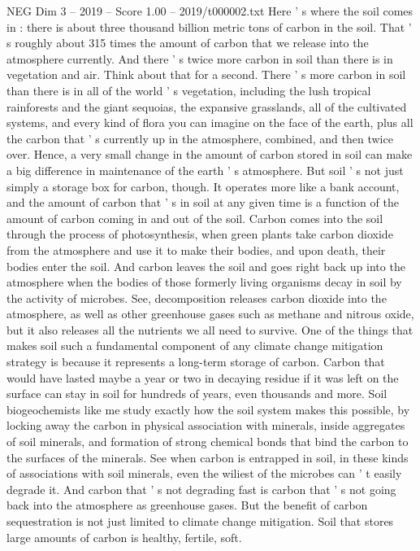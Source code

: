 \begin{textsample}{NEG Dim 3 – 2019 – Score 1.00 – 2019/t000002.txt}
Here ' s where the soil comes in : there is about three thousand billion metric tons of carbon in the soil.
That ' s roughly about 315 times the amount of carbon that we release into the atmosphere currently.
And there ' s twice more carbon in soil than there is in vegetation and air.
Think about that for a second.
There ' s more carbon in soil than there is in all of the world ' s vegetation, including the lush tropical rainforests and the giant sequoias, the expansive grasslands, all of the cultivated systems, and every kind of flora you can imagine on the face of the earth, plus all the carbon that ' s currently up in the atmosphere, combined, and then twice over.
Hence, a very small change in the amount of carbon stored in soil can make a big difference in maintenance of the earth ' s atmosphere.
But soil ' s not just simply a storage box for carbon, though.
It operates more like a bank account, and the amount of carbon that ' s in soil at any given time is a function of the amount of carbon coming in and out of the soil.
Carbon comes into the soil through the process of photosynthesis, when green plants take carbon dioxide from the atmosphere and use it to make their bodies, and upon death, their bodies enter the soil.
And carbon leaves the soil and goes right back up into the atmosphere when the bodies of those formerly living organisms decay in soil by the activity of microbes.
See, decomposition releases carbon dioxide into the atmosphere, as well as other greenhouse gases such as methane and nitrous oxide, but it also releases all the nutrients we all need to survive.
One of the things that makes soil such a fundamental component of any climate change mitigation strategy is because it represents a long-term storage of carbon.
Carbon that would have lasted maybe a year or two in decaying residue if it was left on the surface can stay in soil for hundreds of years, even thousands and more.
Soil biogeochemists like me study exactly how the soil system makes this possible, by locking away the carbon in physical association with minerals, inside aggregates of soil minerals, and formation of strong chemical bonds that bind the carbon to the surfaces of the minerals.
See when carbon is entrapped in soil, in these kinds of associations with soil minerals, even the wiliest of the microbes can ' t easily degrade it.
And carbon that ' s not degrading fast is carbon that ' s not going back into the atmosphere as greenhouse gases.
But the benefit of carbon sequestration is not just limited to climate change mitigation.
Soil that stores large amounts of carbon is healthy, fertile, soft.

\end{textsample}
